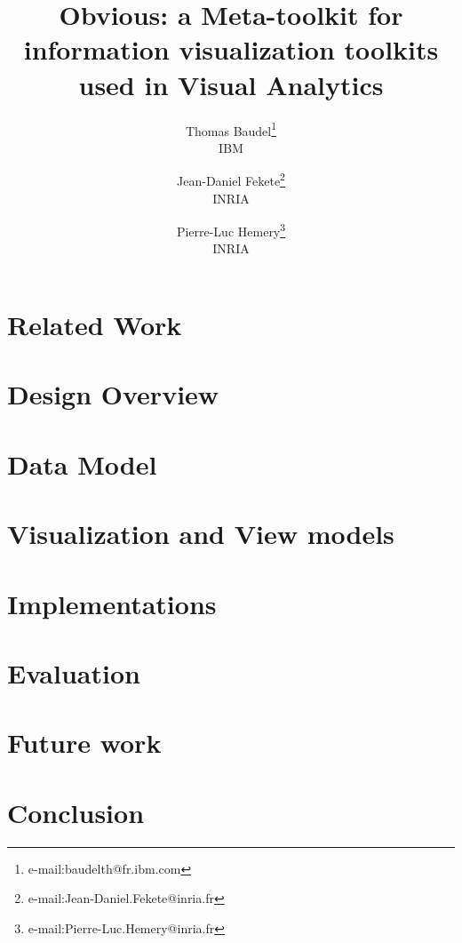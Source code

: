 \documentclass{vgtc}                          %
\title{Obvious: a Meta-toolkit for information visualization toolkits used in Visual Analytics}
\author{%
Thomas Baudel\thanks{e-mail:baudelth@fr.ibm.com}\\ %
  \scriptsize IBM %
\and Jean-Daniel Fekete\thanks{e-mail:Jean-Daniel.Fekete@inria.fr}\\ %
  \scriptsize INRIA %
\and Pierre-Luc Hemery\thanks{e-mail:Pierre-Luc.Hemery@inria.fr}\\ %
  \scriptsize INRIA %
}
\begin{document}

\maketitle



\section{Related Work}



\section{Design Overview}



\section{Data Model}



\section{Visualization and View models}



\section{Implementations}




\section{Evaluation}



\section{Future work}



\section{Conclusion}






\end{document}

